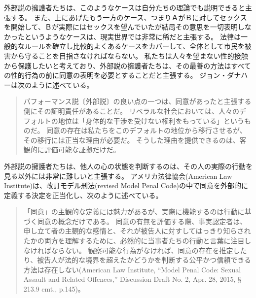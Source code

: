 \documentclass[paper=a4,book,openany]{jlreq}
\begin{document}
外部説の擁護者たちは、このようなケースは自分たちの理論でも説明できると主張する。
また、上にあげたもう一方のケース、つまりＡがＢに対してセックスを開始して、Ｂが実際にはセックスを望んでいたが結局その意思を一切表明しなかったというようなケースは、現実世界では非常に稀だと主張する。
法律は一般的なルールを確立し比較的よくあるケースをカバーして、全体として市民を被害から守ることを目指さなければならない。
私たちは人々を望まない性的接触から保護したいと考えており、外部説の擁護者たちは、その最善の方法はすべての性的行為の前に同意の表明を必要とすることだと主張する。
ジョン・ダナハーは次のように述べている。

\begin{quote}
  パフォーマンス説〔外部説〕の良い点の一つは、同意があったと主張する側にその証明責任があることだ。
リベラルな社会においては、人々のデフォルトの地位は「身体的な干渉を受けない権利をもっている」というものだ。
同意の存在は私たちをこのデフォルトの地位から移行させるが、その移行には正当な理由が必要だ。
そうした理由を提供できるのは、客観的に評価可能な証拠だけだ。
\citep{danaher13:_some_notes_consen_sexual_offen_part_one}
\end{quote}

外部説の擁護者たちは、他人の心の状態を判断するのは、その人の実際の行動を見る以外には非常に難しいと主張する。
アメリカ法律協会(American Law Institute)は、改訂モデル刑法(revised Model Penal Code)の中で同意を外部的に定義する決定を正当化し、次のように述べている。

\begin{quote}
「同意」の主観的な定義には魅力があるが、実際に機能するのは行動に基づく同意の概念だけである。
同意の有無を評価する際、事実認定者は、申し立て者の主観的な感情と、それが被告人に対すしてはっきり知らされたかの両方を理解するために、必然的に当事者たちの行動と言葉に注目しなければならない。
観察可能な行為がなければ、同意の存在を推定したり、被告人が法的な境界を超えたかどうかを判断する公平かつ信頼できる方法は存在しない(American Law  Institute, ``Model Penal Code: Sexual Assault and Related Offences,'' Discussion Draft No. 2, Apr. 28, 2015, § 213.9 cmt., p.145)。
\end{quote}
\end{document}
